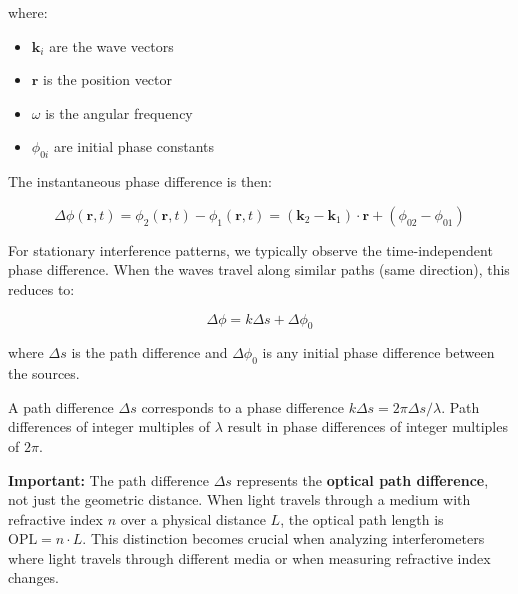 \documentclass[
  a4paper,
]{book}
\providecommand{\tightlist}{%
  \setlength{\itemsep}{0pt}\setlength{\parskip}{0pt}}
\begin{document}
where:

\begin{itemize}
\tightlist
\item
  \(\mathbf{k}_i\) are the wave vectors
\item
  \(\mathbf{r}\) is the position vector
\item
  \(\omega\) is the angular frequency
\item
  \(\phi_{0i}\) are initial phase constants
\end{itemize}

The instantaneous phase difference is then:

\[
\Delta\phi(\mathbf{r},t) = \phi_2(\mathbf{r},t) - \phi_1(\mathbf{r},t) = (\mathbf{k}_2-\mathbf{k}_1)\cdot\mathbf{r} + (\phi_{02}-\phi_{01})
\]

For stationary interference patterns, we typically observe the
time-independent phase difference. When the waves travel along similar
paths (same direction), this reduces to:

\[\Delta\phi = k\Delta s + \Delta\phi_0\]

where \(\Delta s\) is the path difference and \(\Delta\phi_0\) is any
initial phase difference between the sources.

\begin{tcolorbox}[enhanced jigsaw, breakable, toptitle=1mm, bottomrule=.15mm, colbacktitle=quarto-callout-important-color!10!white, title=\textcolor{quarto-callout-important-color}{\faExclamation}\hspace{0.5em}{Phase Difference and Path Difference}, arc=.35mm, rightrule=.15mm, bottomtitle=1mm, opacityback=0, toprule=.15mm, coltitle=black, leftrule=.75mm, opacitybacktitle=0.6, colback=white, left=2mm, titlerule=0mm, colframe=quarto-callout-important-color-frame]

A path difference \(\Delta s\) corresponds to a phase difference
\(k\Delta s=2\pi\Delta s/\lambda\). Path differences of integer
multiples of \(\lambda\) result in phase differences of integer
multiples of \(2\pi\).

\textbf{Important:} The path difference \(\Delta s\) represents the
\textbf{optical path difference}, not just the geometric distance. When
light travels through a medium with refractive index \(n\) over a
physical distance \(L\), the optical path length is
\(\text{OPL} = n \cdot L\). This distinction becomes crucial when
analyzing interferometers where light travels through different media or
when measuring refractive index changes.

\end{tcolorbox}
\end{document}
